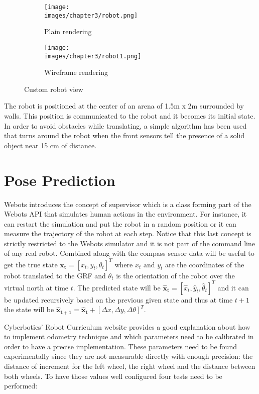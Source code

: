 \begin{figure}[h!]
  \centering
  \begin{subfigure}[b]{0.41\linewidth}
  	\texttt{[image: \\images/chapter3/robot.png]}
	\caption{Plain rendering}
  	\label{fig:ch-3:robot-1}
  \end{subfigure}
  \begin{subfigure}[b]{0.4\linewidth}
  	\texttt{[image: \\images/chapter3/robot1.png]}
	\caption{Wireframe rendering}
  	\label{fig:ch-3:robot-2}
  \end{subfigure}
  \caption{Custom robot view}
  \label{fig:ch-3:robot-view}
\end{figure}

The robot is positioned at the center of an arena of 1.5m x 2m surrounded by walls. This position is communicated to the robot and it becomes its initial state. In order to avoid obstacles while translating, a simple algorithm has been used that turns around the robot when the front sensors tell the presence of a solid object near 15 cm of distance.

\section{Pose Prediction}

Webots introduces the concept of supervisor which is a class forming part of the Webots API that simulates human actions in the environment. For instance, it can restart the simulation and put the robot in a random position or it can measure the trajectory of the robot at each step. Notice that this last concept is strictly restricted to the Webots simulator and it is not part of the command line of any real robot. Combined along with the compass sensor data will be useful to get the true state $\mathbf{x_t} = [x_t, y_t, \theta_t]^T$ where $x_t \text{ and } y_t$ are the coordinates of the robot translated to the GRF and $\theta_t$ is the orientation of the robot over the virtual north at time $t$. The predicted state will be $\mathbf{\hat{x}_{t}} = [\hat{x}_t, \hat{y}_t, \hat{\theta}_t]^T$ and it can be updated recursively based on the previous given state and thus at time $t+1$ the state will be $\mathbf{\hat{x}_{t+1}} = \mathbf{\hat{x}_{t}} + [\Delta x, \Delta y, \Delta \theta]^T$. 

Cyberbotics' Robot Curriculum website\cite{webots-curri-odometry} provides a good explanation about how to implement odometry technique and which parameters need to be calibrated in order to have a precise implementation. These parameters need to be found experimentally since they are not measurable directly with enough precision: the distance of increment for the left wheel, the right wheel and the distance between both wheels. To have those values well configured four tests need to be performed:

